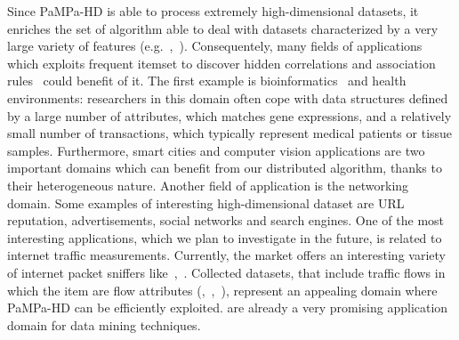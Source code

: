 Since PaMPa-HD is able to process extremely
high-dimensional datasets, it enriches the set of algorithm
able to deal with datasets characterized by a very large variety of features (e.g.~\cite{Vimieiro20141},~\cite{Bermejo201235}).
Consequentely, many fields of applications which exploits frequent itemset to discover hidden correlations and association rules~\cite{KamsuFoguem20131034}
 could benefit of it.
The first example is bioinformatics~\cite{Nahar20131086} and health environments:
researchers in this domain often cope with data structures
defined by a large number of attributes,
which matches gene expressions,
and a relatively small number of transactions,
which typically represent medical patients or tissue samples.
Furthermore, smart cities and computer vision applications
are two important domains which can benefit
from our distributed algorithm,
thanks to their heterogeneous nature.
Another field of application is the networking domain.
Some examples of interesting high-dimensional dataset are
URL reputation, advertisements, social networks and search engines.
One of the most interesting applications,
which we plan to investigate in the future,
is related to internet traffic measurements.
Currently, the market offers an interesting variety of internet packet sniffers
like~\cite{Tstat},~\cite{netflow}. Collected datasets, that include traffic flows in which the item are flow
attributes (\cite{trustcom2013},~\cite{fontas_AR},~\cite{Netmine}), represent an appealing domain where
PaMPa-HD can be efficiently exploited.
are already a very promising application domain
for data mining techniques.
